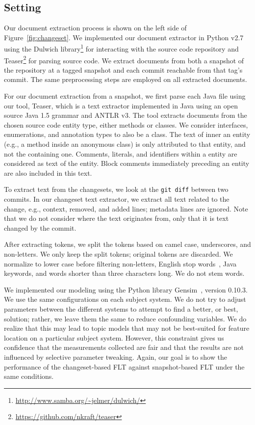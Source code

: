\subsection{Setting}

Our document extraction process is shown on the left side of
Figure~\ref{fig:changeset}.  We implemented our document extractor in Python
v2.7 using the Dulwich
library\footnote{\url{http://www.samba.org/~jelmer/dulwich/}} for interacting
with the source code repository and
Teaser\footnote{\url{https://github.com/nkraft/teaser}} for parsing source code.
We extract documents from both a snapshot of the repository at a tagged snapshot
and each commit reachable from that tag's commit.  The same preprocessing steps
are employed on all extracted documents.

For our document extraction from a snapshot, we first parse each Java file using
our tool, Teaser, which is a text extractor implemented in Java using an open
source Java 1.5 grammar and ANTLR v3.  The tool extracts documents from the
chosen source code entity type, either methods or classes.  We consider
interfaces, enumerations, and annotation types to also be a class.  The text of
inner an entity (e.g., a method inside an anonymous class) is only attributed to
that entity, and not the containing one.  Comments, literals, and identifiers
within a entity are considered as text of the entity.  Block comments
immediately preceding an entity are also included in this text.

To extract text from the changesets, we look at the \texttt{git diff} between
two commits.  In our changeset text extractor, we extract all text related to
the change, e.g., context, removed, and added lines; metadata lines are ignored.
Note that we do not consider where the text originates from, only that it is
text changed by the commit.

After extracting tokens, we split the tokens based on camel case, underscores,
and non-letters.  We only keep the split tokens; original tokens are discarded.
We normalize to lower case before filtering non-letters, English stop
words~\cite{Fox_1992}, Java keywords, and words shorter than three characters
long.  We do not stem words.

We implemented our modeling using the Python library
Gensim~\cite{Rehurek-Sojk_2010}, version 0.10.3. We use the same configurations
on each subject system.  We do not try to adjust parameters between the
different systems to attempt to find a better, or best, solution; rather, we
leave them the same to reduce confounding variables.  We do realize that this
may lead to topic models that may not be best-suited for feature location on a
particular subject system.  However, this constraint gives us confidence that
the measurements collected are fair and that the results are not influenced by
selective parameter tweaking.  Again, our goal is to show the performance of the
changeset-based FLT against snapshot-based FLT under the same conditions.

